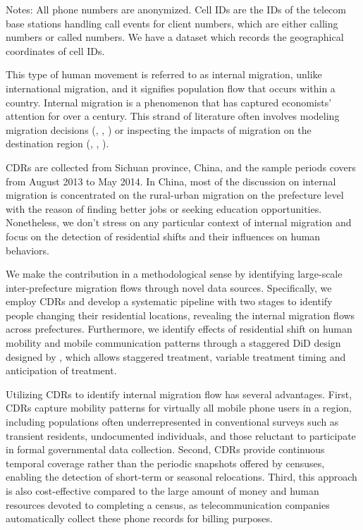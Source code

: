 \vspace{-3em}
\begin{singlespace}
\begin{footnotesize}
\noindent Notes: All phone numbers are anonymized. Cell IDs are the IDs of the telecom base stations handling call events for client numbers, which are either calling numbers or called numbers. We have a dataset which records the geographical coordinates of cell IDs.
\end{footnotesize}
\end{singlespace}

This type of human movement is referred to as internal migration, unlike international migration, and it signifies population flow that occurs within a country. Internal migration is a phenomenon that has captured economists' attention for over a century. This strand of literature often involves modeling migration decisions (\cite{hunt2004north}, \cite{espindola2006harris}, \cite{wang2023job}) or inspecting the impacts of migration on the destination region (\cite{boustan2010effect}, \cite{bryan2019aggregate}, \cite{imbert2022migrants}).

CDRs are collected from Sichuan province, China, and the sample periods covers from August 2013 to May 2014. In China, most of the discussion on internal migration is concentrated on the rural-urban migration on the prefecture level with the reason of finding better jobs or seeking education opportunities. Nonetheless, we don't stress on any particular context of internal migration and focus on the detection of residential shifts and their influences on human behaviors.

We make the contribution in a methodological sense by identifying large-scale inter-prefecture migration flows through novel data sources. Specifically, we employ CDRs and develop a systematic pipeline with two stages to identify people changing their residential locations, revealing the internal migration flows across prefectures. Furthermore, we identify effects of residential shift on human mobility and mobile communication patterns through a staggered DiD design designed by \cite{callaway2021difference}, which allows staggered treatment, variable treatment timing and anticipation of treatment.

Utilizing CDRs to identify internal migration flow has several advantages. First, CDRs capture mobility patterns for virtually all mobile phone users in a region, including populations often underrepresented in conventional surveys such as transient residents, undocumented individuals, and those reluctant to participate in formal governmental data collection. Second, CDRs provide continuous temporal coverage rather than the periodic snapshots offered by censuses, enabling the detection of short-term or seasonal relocations. Third, this approach is also cost-effective compared to the large amount of money and human resources devoted to completing a census, as telecommunication companies automatically collect these phone records for billing purposes.

